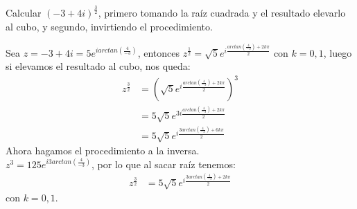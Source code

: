 \begin{homeworkProblem}
  Calcular $(-3+4i)^{\frac{3}{2}}$, primero tomando la raíz cuadrada y el resultado elevarlo al cubo, y segundo, invirtiendo el procedimiento.
  \begin{solution}
    Sea $z=-3+4i=5e^{iarctan\left( \frac{4}{-3} \right)}$, entonces $z^{\frac{1}{2}}=\sqrt{5}e^{i\frac{arctan\left( \frac{4}{-3} \right)+2k\pi}{2}}$ con $k=0,1$, luego si elevamos el resultado al cubo, nos queda:
    \begin{align*}
      z^{\frac{3}{2}}&=\left(\sqrt{5}e^{i\frac{arctan\left( \frac{4}{-3} \right)+2k\pi}{2}}\right)^{3}\\
      &=5\sqrt{5}e^{3i\frac{arctan\left( \frac{4}{-3} \right)+2k\pi}{2}}\\
      &=5\sqrt{5}e^{i\frac{3arctan\left( \frac{4}{-3} \right)+6k\pi}{2}}
    \end{align*}
    Ahora hagamos el procedimiento a la inversa.\\
    $z^{3}=125e^{i3arctan\left( \frac{4}{-3} \right)}$, por lo que al sacar raíz tenemos:
    \begin{align*}
      z^{\frac{3}{2}}&=5\sqrt{5}e^{i\frac{3arctan\left( \frac{4}{-3} \right)+2k\pi}{2}}
    \end{align*}
    con $k=0,1$.
  \end{solution}
\end{homeworkProblem}
